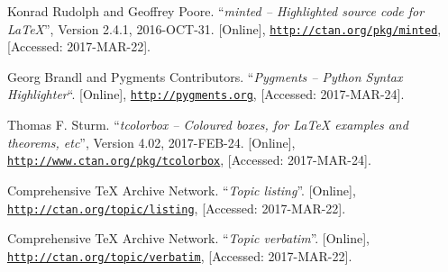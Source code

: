 \documentclass[article,a4paper,oneside,10pt]{memoir}
\begin{document}
\begin{thebibliography}{1}
        Konrad Rudolph and Geoffrey Poore.
        ``\emph{minted -- Highlighted source code for \LaTeX}'',
        Version 2.4.1,
        2016-OCT-31.
        [Online],
        \href{http://ctan.org/pkg/minted}{\nolinkurl{http://ctan.org/pkg/minted}},
        [Accessed: 2017-MAR-22].

        Georg Brandl and Pygments Contributors.
        ``\emph{Pygments -- Python Syntax Highlighter}``.
        [Online],
        \href{http://pygments.org}{\nolinkurl{http://pygments.org}},
        [Accessed: 2017-MAR-24].

        Thomas F. Sturm.
        ``\emph{tcolorbox -- Coloured boxes, for \LaTeX{} examples and theorems, etc}'',
        Version 4.02,
        2017-FEB-24.
        [Online],
        \href{http://www.ctan.org/pkg/tcolorbox}{\nolinkurl{http://www.ctan.org/pkg/tcolorbox}},
        [Accessed: 2017-MAR-24].


        Comprehensive \TeX{} Archive Network.
        ``\emph{Topic listing}''.
        [Online],
        \href{http://ctan.org/topic/listing}{\nolinkurl{http://ctan.org/topic/listing}},
        [Accessed: 2017-MAR-22].

        Comprehensive \TeX{} Archive Network.
        ``\emph{Topic verbatim}''.
        [Online],
        \href{http://ctan.org/topic/verbatim}{\nolinkurl{http://ctan.org/topic/verbatim}},
        [Accessed: 2017-MAR-22].


\end{thebibliography}
\end{document}
